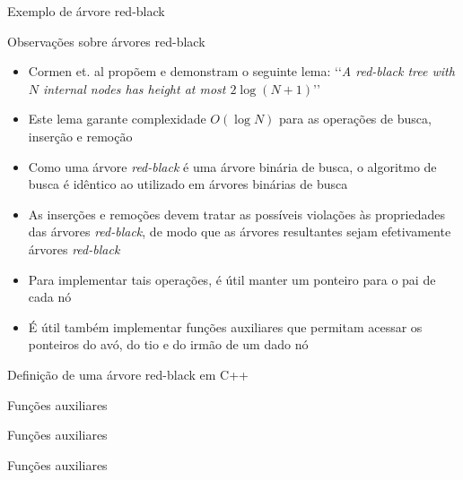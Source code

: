 \begin{frame}[fragile]{Exemplo de árvore red-black}

\end{frame}

\begin{frame}[fragile]{Observações sobre árvores red-black}

    \begin{itemize}
        \item Cormen et. al propõem e demonstram o seguinte lema: \lq\lq\textit{A red-black tree 
            with $N$ internal nodes has height at most $2\log(N + 1)$}\rq\rq

        \item Este lema garante complexidade $O(\log N)$ para as operações de busca, inserção e
            remoção

        \item Como uma árvore \textit{red-black} é uma árvore binária de busca, o algoritmo de
            busca é idêntico ao utilizado em árvores binárias de busca

        \item As inserções e remoções devem tratar as possíveis violações às propriedades das
            árvores \textit{red-black}, de modo que as árvores resultantes sejam efetivamente
            árvores \textit{red-black}

        \item Para implementar tais operações, é útil manter um ponteiro para o pai de cada nó

        \item É útil também implementar funções auxiliares que permitam acessar os ponteiros
            do avó, do tio e do irmão de um dado nó
    \end{itemize}

\end{frame}

\begin{frame}[fragile]{Definição de uma árvore red-black em C++}
\end{frame}

\begin{frame}[fragile]{Funções auxiliares}
\end{frame}

\begin{frame}[fragile]{Funções auxiliares}
\end{frame}

\begin{frame}[fragile]{Funções auxiliares}
\end{frame}

